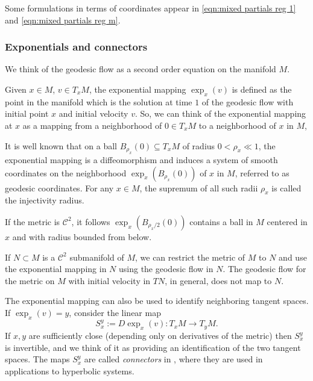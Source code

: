 \documentclass[11pt]{amsart}
\theoremstyle{definition}
\theoremstyle{remark}
\numberwithin{equation}{section}
\newcommand{\C}{\mathcal{C}}
\begin{document}
  Some formulations in terms of coordinates
  appear in \eqref{eqn:mixed partials reg 1}
  and \eqref{eqn:mixed partials reg m}.




\subsubsection{Exponentials and connectors}\label{sec:metrics}



We think of the geodesic flow as a second order equation on
 the manifold $M$.

Given $x \in M$, $v \in T_xM$, the exponential mapping
$\exp_x(v)$ is defined as the point in the manifold which
is  the solution
at time $1$  of the geodesic flow with initial point $x$ and
initial velocity $v$. So, we can think of the exponential
mapping at $x$ as a mapping from a neighborhood of $0 \in T_xM$
to a neighborhood of $x$ in $M$,


It is well known \cite[Prop 4.5.2]{BurnsG05}
that on a ball $B_{\rho_x}(0)\subseteq T_xM$  of radius $0 < \rho_x \ll 1$,
the exponential mapping is a diffeomorphism and induces a system of smooth coordinates on the neighborhood $\exp_x(B_{\rho_x}(0))$ of $x$ in $M$,
referred to as geodesic coordinates.
For any $x \in M$, the supremum of all such radii  $\rho_x$ is called the injectivity radius.

If the metric is $\C^2$, it follows
$\exp_x(B_{\rho_x/2}(0))$  contains a ball in $M$
centered in $x$ and with radius bounded from below.


If $N \subset M$ is  a $\C^2$ submanifold of $M$, we can restrict the metric
of $M$ to $N$ and use the exponential mapping in $N$ using the
geodesic flow in $N$. The
geodesic flow  for the metric on $M$ with initial velocity in $TN$,
in general, does not map to
$N$.


The exponential mapping can also be  used to identify
neighboring tangent spaces.
If $\exp_x(v) = y$, consider the linear map
\begin{equation}
\label{eqn:connectors}
S_x^y:=D \exp_x(v): T_x M \to T_y M .
\end{equation}
If $x,y$ are sufficiently close (depending only on
derivatives of the metric) then $S_x^y$  is invertible,
and we think of it as providing an identification of the two
tangent spaces.  The maps $S_x^y$ are called
\emph{connectors} in \cite{HirschPPS69}, where they are used  in applications to hyperbolic systems.
\end{document}
